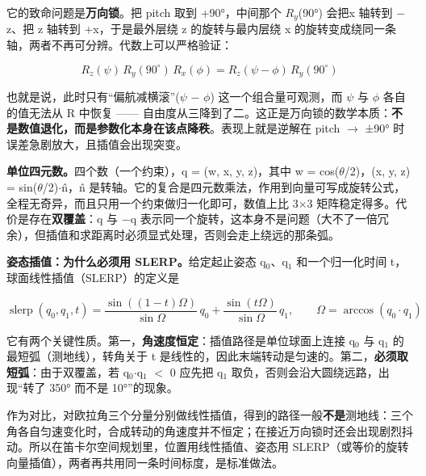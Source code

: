\documentclass[11pt,a4paper]{ctexart}
\begin{document}
它的致命问题是\textbf{万向锁}。把 pitch 取到 +90°，中间那个 $R_{y}$(90°) 会把x 轴转到 $-$z、把 z 轴转到 +x，于是最外层绕 z 的旋转与最内层绕 x 的旋转变成绕同一条轴，两者不再可分辨。代数上可以严格验证：\par

\begin{equation}R_z(\psi)\,R_y(90^{\circ})\,R_x(\phi)=R_z(\psi-\phi)\,R_y(90^{\circ})\end{equation}

也就是说，此时只有“偏航减横滚”($\psi$ $-$ $\phi$) 这一个组合量可观测，而 $\psi$ 与 $\phi$ 各自的值无法从 R 中恢复 —— 自由度从三降到了二。这正是万向锁的数学本质：\textbf{不是数值退化，而是参数化本身在该点降秩}。表现上就是逆解在 pitch $\rightarrow$ ±90° 时误差急剧放大，且插值会出现突变。\par

\textbf{单位四元数。}四个数（一个约束），q = (w, x, y, z)，其中 w = cos($\theta$/2)，(x, y, z) = sin($\theta$/2)$\cdot$n̂，n̂ 是转轴。它的复合是四元数乘法，作用到向量可写成旋转公式，全程无奇异，而且只用一个约束做归一化即可，数值上比 3$\times$3 矩阵稳定得多。代价是存在\textbf{双覆盖}：q 与 $-$q 表示同一个旋转，这本身不是问题（大不了一倍冗余），但插值和求距离时必须显式处理，否则会走上绕远的那条弧。\par

\textbf{姿态插值：为什么必须用 SLERP。}给定起止姿态 q$_{0}$、q$_{1}$ 和一个归一化时间 t，球面线性插值（SLERP）的定义是\par

\begin{equation}\operatorname{slerp}(q_0,q_1,t)=\frac{\sin\left((1-t)\Omega\right)}{\sin\Omega}\,q_0+\frac{\sin\left(t\Omega\right)}{\sin\Omega}\,q_1,\qquad \Omega=\arccos(q_0\cdot q_1)\end{equation}

它有两个关键性质。第一，\textbf{角速度恒定}：插值路径是单位球面上连接 q$_{0}$ 与 q$_{1}$ 的最短弧（测地线），转角关于 t 是线性的，因此末端转动是匀速的。第二，\textbf{必须取短弧}：由于双覆盖，若 q$_{0}$$\cdot$q$_{1}$ $<$ 0 应先把 q$_{1}$ 取负，否则会沿大圆绕远路，出现“转了 350° 而不是 10°”的现象。\par

作为对比，对欧拉角三个分量分别做线性插值，得到的路径一般\textbf{不是}测地线：三个角各自匀速变化时，合成转动的角速度并不恒定；在接近万向锁时还会出现剧烈抖动。所以在笛卡尔空间规划里，位置用线性插值、姿态用 SLERP（或等价的旋转向量插值），两者再共用同一条时间标度，是标准做法。\par
\end{document}
